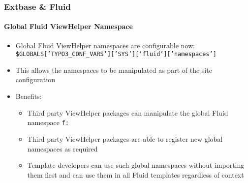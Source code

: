 \begin{frame}[fragile]
	\frametitle{Extbase \& Fluid}
	\framesubtitle{Global Fluid ViewHelper Namespace}

	\begin{itemize}
		\item Global Fluid ViewHelper namespaces are configurable now:\newline
			\smaller
				\texttt{\$GLOBALS['TYPO3\_CONF\_VARS']['SYS']['fluid']['namespaces']}
			\normalsize
		\item This allows the namespaces to be manipulated as part of the site configuration
		\item Benefits:

			\begin{itemize}
				\item Third party ViewHelper packages can manipulate the global Fluid namespace \texttt{f:}
				\item Third party ViewHelper packages are able to register new global namespaces as required
				\item Template developers can use such global namespaces without importing them first
					and can use them in all Fluid templates regardless of context
			\end{itemize}

	\end{itemize}

\end{frame}


